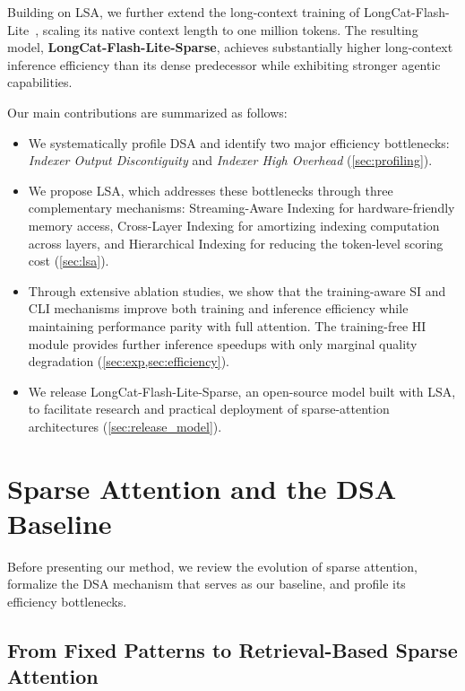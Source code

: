 \documentclass{article}
\begin{document}
Building on LSA, we further extend the long-context training of LongCat-Flash-Lite~\citep{liu2026scaling}, scaling its native context length to one million tokens. The resulting model, \textbf{LongCat-Flash-Lite-Sparse}, achieves substantially higher long-context inference efficiency than its dense predecessor while exhibiting stronger agentic capabilities.

Our main contributions are summarized as follows:
\begin{itemize}
    \item We systematically profile DSA and identify two major efficiency bottlenecks: \emph{Indexer Output Discontiguity} and \emph{Indexer High Overhead} (\cref{sec:profiling}).

    \item We propose LSA, which addresses these bottlenecks through three complementary mechanisms: Streaming-Aware Indexing for hardware-friendly memory access, Cross-Layer Indexing for amortizing indexing computation across layers, and Hierarchical Indexing for reducing the token-level scoring cost (\cref{sec:lsa}).

    \item Through extensive ablation studies, we show that the training-aware SI and CLI mechanisms improve both training and inference efficiency while maintaining performance parity with full attention. The training-free HI module provides further inference speedups with only marginal quality degradation (\cref{sec:exp,sec:efficiency}).

    \item We release LongCat-Flash-Lite-Sparse, an open-source model built with LSA, to facilitate research and practical deployment of sparse-attention architectures (\cref{sec:release_model}).
\end{itemize}

\section{Sparse Attention and the DSA Baseline}
\label{sec:dsa}

Before presenting our method, we review the evolution of sparse attention, formalize the DSA mechanism that serves as our baseline, and profile its efficiency bottlenecks.

\subsection{From Fixed Patterns to Retrieval-Based Sparse Attention}
\label{sec:frontier}
\end{document}
